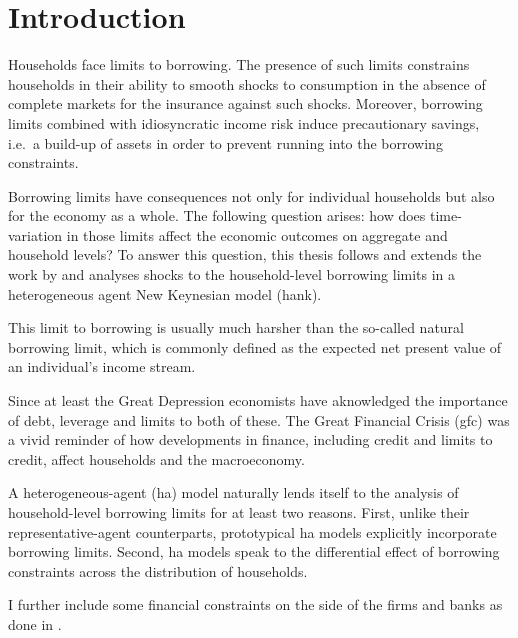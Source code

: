 \documentclass[12pt]{article}
\numberwithin{equation}{section} %
\begin{document}
\newpage
{} %
\pagestyle{fancy}
\fancyhf{}
\fancyhead[C]{\leftmark}
\fancyfoot[C]{\thepage}
\thispagestyle{plain}
\section{Introduction}
\label{sec:introduction}

Households face limits to borrowing. The presence of such limits constrains households in their ability to smooth shocks to consumption in the absence of complete markets for the insurance against such shocks. Moreover, borrowing limits combined with idiosyncratic income risk induce precautionary savings, i.e.~a build-up of assets in order to prevent running into the borrowing constraints.

Borrowing limits have consequences not only for individual households but also for the economy as a whole. The following question arises: how does time-variation in those limits affect the economic outcomes on aggregate and household levels? To answer this question, this thesis follows and extends the work by \textcite{gl2017} and analyses shocks to the household-level borrowing limits in a heterogeneous agent New Keynesian model (\Gls{hank}).

This limit to borrowing is usually much harsher than the so-called natural borrowing limit, which is commonly defined as the expected net present value of an individual's income stream. 

Since at least the Great Depression economists have aknowledged the importance of debt, leverage and limits to both of these. The Great Financial Crisis (\Gls{gfc}) was a vivid reminder of how developments in finance, including credit and limits to credit, affect households and the macroeconomy. 

A heterogeneous-agent (\Gls{ha}) model naturally lends itself to the analysis of household-level borrowing limits for at least two reasons. First, unlike their representative-agent counterparts, prototypical \Gls{ha} models explicitly incorporate borrowing limits. Second, \Gls{ha} models speak to the differential effect of borrowing constraints across the distribution of households.

I further include some financial constraints on the side of the firms and banks as done in \textcite{zoch2022}.
\end{document}

